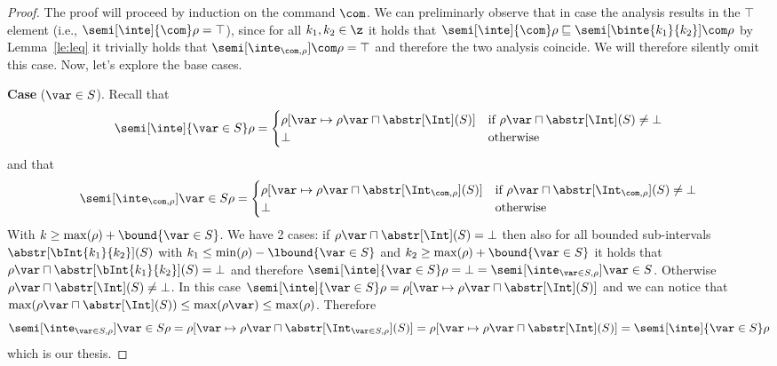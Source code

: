 \begin{proof}

  The proof will proceed by induction on the command \(\com\). We can
  preliminarly observe that in case the analysis results in the
  \(\top\) element (i.e., \({\semi[\inte]{\com}\rho = \top}\)), since
  for all \(k_1,k_2 \in \z\) it holds that
  \(\semi[\inte]{\com}\rho \sqsubseteq
  \semi[\binte{k_1}{k_2}]{\com}\rho\) by Lemma~\ref{le:leq} it
  trivially holds that \(\semi[\inte_{\com,\rho}]{\com}\rho = \top\)
  and therefore the two analysis coincide. We will therefore silently
  omit this case.  Now, let's explore the base cases.

  \medskip
  
  \noindent
  \textbf{Case} (\(\var \in S\)).
  Recall that
  \begin{equation*}
    \semi[\inte]{\var \in S}\rho = \begin{cases}
      \rho[\var \mapsto \rho\var \sqcap \abstr[\Int](S)] & \text{if } \rho\var \sqcap \abstr[\Int](S) \neq \bot \\
      \bot & \text{otherwise}
    \end{cases}
  \end{equation*}
  and that
  \begin{equation*}
    \semi[\inte_{\com,\rho}]{\var \in S}\rho = \begin{cases}
      \rho[\var \mapsto \rho\var \sqcap \abstr[\Int_{\com,\rho}](S)] & \text{if } \rho\var \sqcap \abstr[\Int_{\com,\rho}](S) \neq \bot \\
      \bot & \text{otherwise}
    \end{cases}
  \end{equation*}
  With \(k \geq \max(\rho) + \bound{\var \in S}\). We have 2 cases: if
  \({\rho\var \sqcap \abstr[\Int](S) = \bot}\) then also for all
  bounded sub-intervals \(\abstr[\bInt{k_1}{k_2}](S)\) with
  \(k_1 \leq \min(\rho) - \lbound{\var\in S}\) and
  \(k_2 \geq \max(\rho) + \bound{\var\in S}\) it holds that
  \({\rho\var \sqcap \abstr[\bInt{k_1}{k_2}](S) = \bot}\) and
  therefore
  \({\semi[\inte]{\var\in S}\rho = \bot = \semi[\inte_{\var\in S,
      \rho}]{\var \in S}}\). Otherwise
  \({\rho\var \sqcap \abstr[\Int](S) \neq \bot}\). In this case
  \({\semi[\inte]{\var \in S}\rho = \rho[\var \mapsto \rho\var \sqcap
    \abstr[\Int](S)]}\) and we can notice that
  \(\max(\rho\var \sqcap \abstr[\Int](S)) \leq \max(\rho\var) \leq
  \max(\rho)\). Therefore
  \begin{equation*}
    \semi[\inte_{\var \in S,\rho}]{\var \in S}\rho = \rho[\var \mapsto \rho\var \sqcap \abstr[\Int_{\var \in S,\rho}](S)]
    = \rho[\var \mapsto \rho\var \sqcap \abstr[\Int](S)] = \semi[\inte]{\var\in S}\rho
  \end{equation*}
  which is our thesis.


\end{proof}
